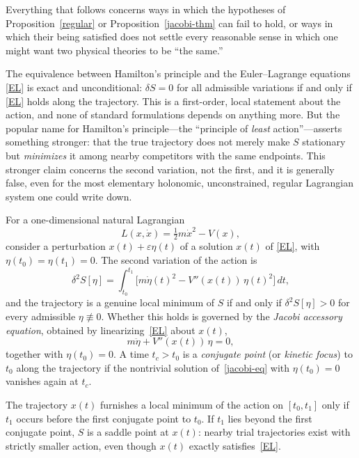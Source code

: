 Everything that follows  concerns ways in which the
hypotheses of Proposition~\ref{regular} or
Proposition~\ref{jacobi-thm} can fail to hold, or ways in which their
being satisfied does not settle every reasonable sense in which one might want
two physical theories to be ``the same.'' 

The equivalence between Hamilton's principle and the Euler--Lagrange
equations \eqref{EL} is exact and unconditional: $\delta S=0$ for all
admissible variations if and only if \eqref{EL} holds along the trajectory.
This is a first-order, local statement about the action, and none of
standard formulations depends on anything more. But the popular name for
Hamilton's principle---the ``principle of \emph{least} action''---asserts
something stronger: that the true trajectory does not merely make $S$
stationary but \emph{minimizes} it among nearby competitors with the same
endpoints. This stronger claim concerns the second variation, not the first,
and it is generally false, even for the most elementary holonomic,
unconstrained, regular Lagrangian system one could write down.

For a one-dimensional natural Lagrangian 
$$L(x,\dot x) = \tfrac12 m\dot x^2 - V(x),$$
consider a perturbation $x(t)+\varepsilon\eta(t)$ of a solution $x(t)$
of \eqref{EL}, with $\eta(t_0)=\eta(t_1)=0$. The second variation of the action
is
\begin{equation}
\delta^2 S[\eta] = \int_{t_0}^{t_1} \Big[ m\dot\eta(t)^2 - V''(x(t))\,\eta(t)^2 \Big]\, dt ,
\end{equation}
and the trajectory is a genuine local minimum of $S$ if and only if
$\delta^2S[\eta]>0$ for every admissible $\eta\not\equiv0$. Whether this holds
is governed by the \emph{Jacobi accessory equation}, obtained by
linearizing~\eqref{EL} about $x(t)$,
\begin{equation}
\label{jacobi-eq}
m\ddot\eta + V''(x(t))\,\eta = 0 ,
\end{equation}
together with $\eta(t_0)=0$. A time $t_c>t_0$ is a \emph{conjugate point} (or
\emph{kinetic focus}) to $t_0$ along the trajectory if the nontrivial solution
of~\eqref{jacobi-eq} with $\eta(t_0)=0$ vanishes again at $t_c$.

\begin{proposition}
\label{jacobi-necessary}
The trajectory $x(t)$ furnishes a local minimum of the action on $[t_0,t_1]$
    only if $t_1$ occurs before the first conjugate point to $t_0$. If $t_1$
    lies beyond the first conjugate point, $S$ is a saddle point at $x(t)$:
    nearby trial trajectories exist with strictly smaller action, even though
    $x(t)$ exactly satisfies~\eqref{EL}.
\end{proposition}

